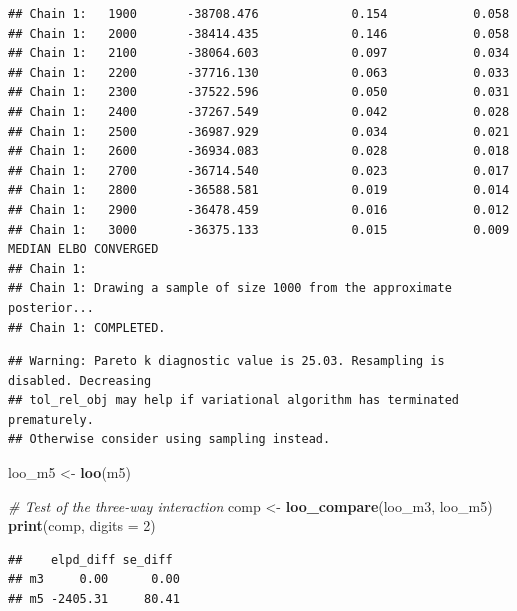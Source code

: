 \documentclass[
]{article}
\newenvironment{Shaded}{\begin{snugshade}}{\end{snugshade}}
\newcommand{\AttributeTok}[1]{\textcolor[rgb]{0.13,0.29,0.53}{#1}}
\newcommand{\CommentTok}[1]{\textcolor[rgb]{0.56,0.35,0.01}{\textit{#1}}}
\newcommand{\DecValTok}[1]{\textcolor[rgb]{0.00,0.00,0.81}{#1}}
\newcommand{\FunctionTok}[1]{\textcolor[rgb]{0.13,0.29,0.53}{\textbf{#1}}}
\newcommand{\NormalTok}[1]{#1}
\newcommand{\OtherTok}[1]{\textcolor[rgb]{0.56,0.35,0.01}{#1}}
\begin{document}
\begin{verbatim}
## Chain 1:   1900       -38708.476             0.154            0.058
## Chain 1:   2000       -38414.435             0.146            0.058
## Chain 1:   2100       -38064.603             0.097            0.034
## Chain 1:   2200       -37716.130             0.063            0.033
## Chain 1:   2300       -37522.596             0.050            0.031
## Chain 1:   2400       -37267.549             0.042            0.028
## Chain 1:   2500       -36987.929             0.034            0.021
## Chain 1:   2600       -36934.083             0.028            0.018
## Chain 1:   2700       -36714.540             0.023            0.017
## Chain 1:   2800       -36588.581             0.019            0.014
## Chain 1:   2900       -36478.459             0.016            0.012
## Chain 1:   3000       -36375.133             0.015            0.009   MEDIAN ELBO CONVERGED
## Chain 1: 
## Chain 1: Drawing a sample of size 1000 from the approximate posterior... 
## Chain 1: COMPLETED.
\end{verbatim}

\begin{verbatim}
## Warning: Pareto k diagnostic value is 25.03. Resampling is disabled. Decreasing
## tol_rel_obj may help if variational algorithm has terminated prematurely.
## Otherwise consider using sampling instead.
\end{verbatim}

\begin{Shaded}
\begin{Highlighting}[]
\NormalTok{loo\_m5 }\OtherTok{\textless{}{-}} \FunctionTok{loo}\NormalTok{(m5)}

\CommentTok{\# Test of the three{-}way interaction}
\NormalTok{comp }\OtherTok{\textless{}{-}} \FunctionTok{loo\_compare}\NormalTok{(loo\_m3, loo\_m5)}
\FunctionTok{print}\NormalTok{(comp, }\AttributeTok{digits =} \DecValTok{2}\NormalTok{)}
\end{Highlighting}
\end{Shaded}

\begin{verbatim}
##    elpd_diff se_diff 
## m3     0.00      0.00
## m5 -2405.31     80.41
\end{verbatim}
\end{document}
